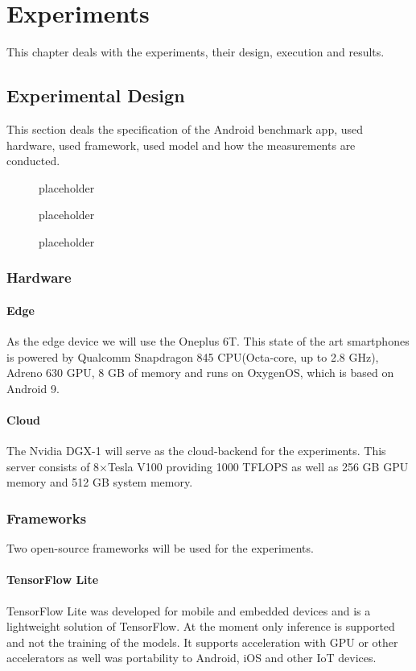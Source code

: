 \chapter{Experiments}
\label{chap:experiments}
This chapter deals with the experiments, their design, execution and results.
\section{Experimental Design}
This section deals the specification of the Android benchmark app, used hardware, used framework, used model and how the measurements are conducted. 
\begin{figure}[H]
\centering

\caption{placeholder}
\label{fig:cloud}
\end{figure}
\begin{figure}[H]
\centering

\caption{placeholder}
\label{fig:cloud}
\end{figure}
\begin{figure}[H]
\centering

\caption{placeholder}
\label{fig:edge}
\end{figure}
\subsection{Hardware}
\subsubsection{Edge}
As the edge device we will use the Oneplus 6T. This state of the art smartphones is powered by Qualcomm Snapdragon 845 CPU(Octa-core, up to 2.8 GHz), Adreno 630 GPU, 8 GB of memory and runs on OxygenOS, which is based on Android 9.
\subsubsection{Cloud}
The Nvidia DGX-1 will serve as the cloud-backend for the experiments. This server consists of 8$\times$Tesla V100 providing 1000 TFLOPS as well as 256 GB GPU memory and 512 GB system memory.
\subsection{Frameworks}
Two open-source frameworks will be used for the experiments.
\subsubsection{TensorFlow Lite}
TensorFlow Lite was developed for mobile and embedded devices and is a lightweight solution of TensorFlow.
At the moment only inference is supported and not the training of the models.
It supports acceleration with GPU or other accelerators as well was portability to Android, iOS and other IoT devices.


